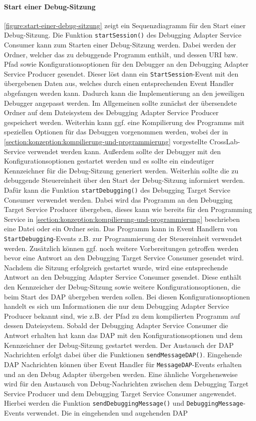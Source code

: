 \paragraph{Start einer Debug-Sitzung} \autoref{figure:start-einer-debug-sitzung} zeigt ein Sequenzdiagramm für den Start einer Debug-Sitzung. Die Funktion \texttt{startSession()} des Debugging Adapter Service Consumer kann zum Starten einer Debug-Sitzung werden. Dabei werden der Ordner, welcher das zu debuggende Programm enthält, und dessen URI bzw. Pfad sowie Konfigurationsoptionen für den Debugger an den Debugging Adapter Service Producer gesendet. Dieser löst dann ein \texttt{StartSession}-Event mit den übergebenen Daten aus, welches durch einen entsprechenden Event Handler abgefangen werden kann. Dadurch kann die Implementierung an den jeweiligen Debugger angepasst werden. Im Allgemeinen sollte zunächst der übersendete Ordner auf dem Dateisystem des Debugging Adapter Service Producer gespeichert werden. Weiterhin kann ggf. eine Kompilierung des Programms mit speziellen Optionen für das Debuggen vorgenommen werden, wobei der in \autoref{section:konzeption:kompilierung-und-programmierung} vorgestellte CrossLab-Service verwendet werden kann. Außerdem sollte der Debugger mit den Konfigurationsoptionen gestartet werden und es sollte ein eindeutiger Kennzeichner für die Debug-Sitzung generiert werden. Weiterhin sollte die zu debuggende Steuereinheit über den Start der Debug-Sitzung informiert werden. Dafür kann die Funktion \texttt{startDebugging()} des Debugging Target Service Consumer verwendet werden. Dabei wird das Programm an den Debugging Target Service Producer übergeben, dieses kann wie bereits für den Programming Service in \autoref{section:konzeption:kompilierung-und-programmierung} beschrieben eine Datei oder ein Ordner sein. Das Programm kann in Event Handlern von \texttt{StartDebugging}-Events z.B. zur Programmierung der Steuereinheit verwendet werden. Zusätzlich können ggf. noch weitere Vorbereitungen getroffen werden bevor eine Antwort an den Debugging Target Service Consumer gesendet wird. Nachdem die Sitzung erfolgreich gestartet wurde, wird eine entsprechende Antwort an den Debugging Adapter Service Consumer gesendet. Diese enthält den Kennzeicher der Debug-Sitzung sowie weitere Konfigurationsoptionen, die beim Start des \ac{DAP} übergeben werden sollen. Bei diesen Konfigurationsoptionen handelt es sich um Informationen die nur dem Debugging Adapter Service Producer bekannt sind, wie z.B. der Pfad zu dem kompilierten Programm auf dessen Dateisystem. Sobald der Debugging Adapter Service Consumer die Antwort erhalten hat kann das \ac{DAP} mit den Konfigurationsoptionen und dem Kennzeichner der Debug-Sitzung gestartet werden. Der Austausch der \ac{DAP} Nachrichten erfolgt dabei über die Funktionen \texttt{sendMessageDAP()}. Eingehende \ac{DAP} Nachrichten können über Event Handler für \texttt{MessageDAP}-Events erhalten und an den Debug Adapter übergeben werden. Eine ähnliche Vorgehensweise wird für den Austausch von Debug-Nachrichten zwischen dem Debugging Target Service Producer und dem Debugging Target Service Consumer angewendet. Hierbei werden die Funktion \texttt{sendDebuggingMessage()} und \texttt{DebuggingMessage}-Events verwendet. Die in eingehenden und augehenden DAP 